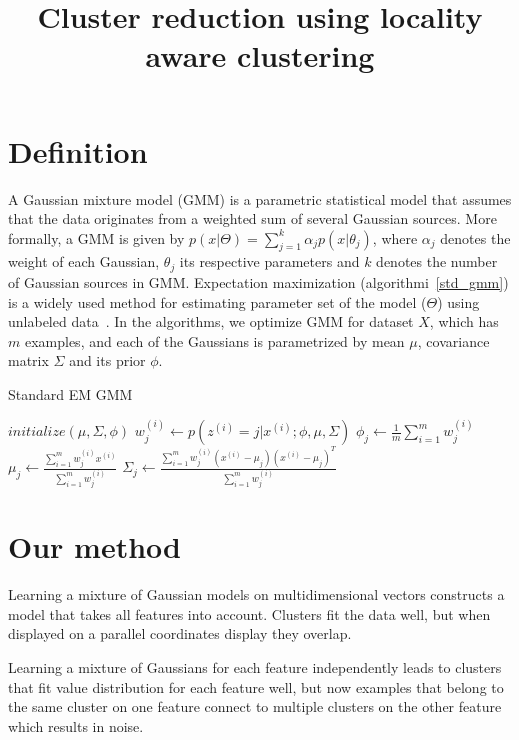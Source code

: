 \documentclass[10pt,a4paper]{article}
\title{Cluster reduction using locality aware clustering}
\begin{document}
\maketitle
\section{Definition}
A Gaussian mixture model (GMM) is a parametric statistical model that assumes that the data originates from a weighted sum of several Gaussian sources. More formally, a GMM is given by
$p(x|\Theta) = \sum^k_{j=1}\alpha_jp(x|\theta_j)$, where $\alpha_j$ denotes the weight of each Gaussian, $\theta_j$ its respective parameters and  $k$ denotes the number of Gaussian sources in GMM. Expectation maximization (algorithmi~\ref{std_gmm}) is a widely used method for estimating parameter set of the model ($\Theta$) using unlabeled data~\cite{dempster77}. In the algorithms, we optimize GMM for dataset $X$, which has $m$ examples, and each of the Gaussians is parametrized by mean $\mu$, covariance matrix $\Sigma$ and its prior $\phi$. 


\begin{algorithm}
\caption{Standard EM GMM}
\label{std_gmm}
\begin{algorithmic}
\State $initialize(\mu, \Sigma, \phi)$
        \State $w_j^{(i)}\gets p(z^{(i)} = j|x^{(i)}; \phi, \mu, \Sigma)$
    \EndFor
    \State
    \State $\phi_j\gets\frac{1}{m}\sum_{i=1}^{m}w_j^{(i)}$
    \State $\mu_j\gets\frac{\sum_{i=1}^mw_j^{(i)}x^{(i)}}{\sum_{i=1}^mw_j^{(i)}}$
    \State $\Sigma_j\gets\frac{\sum_{i=1}^mw_j^{(i)}(x^{(i)}-\mu_j)(x^{(i)}-\mu_j)^T}{\sum_{i=1}^mw_j^{(i)}}$
\EndFor
\EndFunction
\end{algorithmic}
\end{algorithm}

\section{Our method}
Learning a mixture of Gaussian models on multidimensional vectors constructs a model that takes all features into account. Clusters fit the data well, but when displayed on a parallel coordinates display they overlap.

Learning a mixture of Gaussians for each feature independently leads to clusters that fit value distribution for each feature well, but now examples that belong to the same cluster on one feature connect to multiple clusters on the other feature which results in noise.
\end{document}
